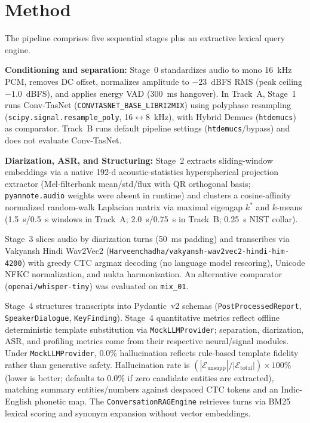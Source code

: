 \documentclass[11pt,a4paper,twocolumn]{article}
\begin{document}
\section{Method}
The pipeline comprises five sequential stages plus an extractive lexical query engine.

\noindent\textbf{Conditioning and separation:} Stage~0 standardizes audio to mono 16~kHz PCM, removes DC offset, normalizes amplitude to $-23$~dBFS RMS (peak ceiling $-1.0$~dBFS), and applies energy VAD (300~ms hangover). In Track~A, Stage~1 runs Conv-TasNet (\texttt{CONVTASNET\_BASE\_LIBRI2MIX}) using polyphase resampling (\texttt{scipy.signal.resample\_poly}, 16$\leftrightarrow$8~kHz), with Hybrid Demucs (\texttt{htdemucs}) as comparator. Track~B runs default pipeline settings (\texttt{htdemucs}/bypass) and does not evaluate Conv-TasNet.

\noindent\textbf{Diarization, ASR, and Structuring:} Stage~2 extracts sliding-window embeddings via a native 192-d acoustic-statistics hyperspherical projection extractor (Mel-filterbank mean/std/flux with QR orthogonal basis; \texttt{pyannote.audio} weights were absent in runtime) and clusters a cosine-affinity normalized random-walk Laplacian matrix via maximal eigengap $k^*$ and $k$-means (1.5~s/0.5~s windows in Track~A; 2.0~s/0.75~s in Track~B; 0.25~s NIST collar).

Stage~3 slices audio by diarization turns (50~ms padding) and transcribes via Vakyansh Hindi Wav2Vec2 (\texttt{Harveenchadha/}\allowbreak\texttt{vakyansh-wav2vec2-hindi-him-4200}) with greedy CTC argmax decoding (no language model rescoring), Unicode NFKC normalization, and nukta harmonization. An alternative comparator (\texttt{openai/whisper-tiny}) was evaluated on \texttt{mix\_01}.

Stage~4 structures transcripts into Pydantic~v2 schemas (\texttt{PostProcessedReport}, \texttt{SpeakerDialogue}, \texttt{KeyFinding}). Stage~4 quantitative metrics reflect offline deterministic template substitution via \texttt{MockLLMProvider}; separation, diarization, ASR, and profiling metrics come from their respective neural/signal modules. Under \texttt{MockLLMProvider}, 0.0\% hallucination reflects rule-based template fidelity rather than generative safety. Hallucination rate is $(|\mathcal{E}_{\text{unsupp}}| / |\mathcal{E}_{\text{total}}|) \times 100\%$ (lower is better; defaults to 0.0\% if zero candidate entities are extracted), matching summary entities/numbers against despaced CTC tokens and an Indic-English phonetic map. The \texttt{ConversationRAGEngine} retrieves turns via BM25 lexical scoring and synonym expansion without vector embeddings.
\end{document}
